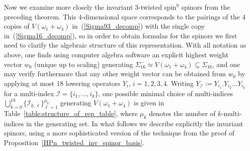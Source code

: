 \documentclass[pdftex]{sigma}
\numberwithin{equation}{section}
\begin{document}
		Now we examine more closely the invariant 3-twisted spin$^9$ spinors from the preceding theorem. This $4$-dimensional space corresponds to the pairings of the $4$ copies of $V(\omega_1+\omega_4)$ in~(\ref{Sigma93_decomp}) with the single copy in~(\ref{Sigma16_decomp}), so in order to obtain formulas for the spinors we first need to clarify the algebraic structure of this representation. With all notation as above, one finds using computer algebra software an explicit highest weight vector $w_0$ (unique up to scaling) generating $\Sigma_{16}^- \simeq V(\omega_1+\omega_4)\subseteq \Sigma_{16}$, and one may verify furthermore that any other weight vector can be obtained from $w_0$ by applying at most $18$ lowering operators $Y_i$, $i=1,2,3,4$. Writing $Y_{\mathcal{I}} := Y_{i_1}.Y_{i_2}\dots Y_{i_k}$ for a multi-index $\mathcal{I}=\{i_1,\dots,i_k\}$, one possible minimal choice of multi-indices $\bigcup_{k=0}^{18}\{ \mathcal{I}_{k,\ell}\}_{\ell=1}^{\mu_k}$ generating $V(\omega_1+\omega_4)$ is given in Table~\ref{table:structure_of_rep_table}, where $\mu_k$ denotes the number of $k$-multi-indices in the generating set. In what follows we describe explicitly the invariant spinors, using a more sophisticated version of the technique from the proof of Proposition~\ref{HPn_twisted_inv_spinor_basis}.
\end{document}
